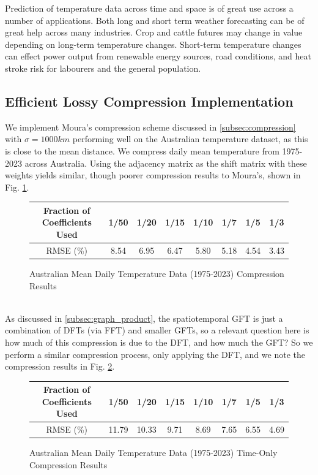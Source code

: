 \documentclass[12pt,a4paper]{article} %
\begin{document}
Prediction of temperature data across time and space is of great use across a number of applications. Both long and short term weather forecasting can be of great help across many industries. Crop and cattle futures may change in value depending on long-term temperature changes. Short-term temperature changes can effect power output from renewable energy sources, road conditions, and heat stroke risk for labourers and the general population.
\subsection{Efficient Lossy Compression Implementation}
\label{subsec:efficient_GFT}
 We implement Moura's compression scheme discussed in \ref{subsec:compression} with $\sigma=1000km$ performing well on the Australian temperature dataset, as this is close to the mean distance. We compress daily mean temperature from 1975-2023 across Australia. Using the adjacency matrix as the shift matrix with these weights yields similar, though poorer compression results to Moura's, shown in Fig. \ref{fig:aus_compression}.
\begin{figure}[!ht]
    \centering
        \begin{tabular}{|c|c|c|c|c|c|c|c|}
         \hline
         Fraction of Coefficients Used & 1/50 & 1/20 & 1/15 & 1/10 & 1/7 & 1/5 & 1/3 \\
         \hline
         RMSE (\%) & 8.54 & 6.95 & 6.47 & 5.80 & 5.18 & 4.54 & 3.43 \\
         \hline
    \end{tabular}
    \caption{Australian Mean Daily Temperature Data (1975-2023) Compression Results}
    \label{fig:aus_compression}
\end{figure}\\
As discussed in \ref{subsec:graph_product}, the spatiotemporal GFT is just a combination of DFTs (via FFT) and smaller GFTs, so a relevant question here is how much of this compression is due to the DFT, and how much the GFT? So we perform a similar compression process, only applying the DFT, and we note the compression results in Fig. \ref{fig:aus_compression2}.
\begin{figure}[!ht]
    \centering
        \begin{tabular}{|c|c|c|c|c|c|c|c|}
         \hline
         Fraction of Coefficients Used & 1/50 & 1/20 & 1/15 & 1/10 & 1/7 & 1/5 & 1/3 \\
         \hline
         RMSE (\%) & 11.79&	10.33&	9.71&	8.69&	7.65&	6.55&	4.69\\
         \hline
    \end{tabular}
    \caption{Australian Mean Daily Temperature Data (1975-2023) Time-Only Compression Results}
    \label{fig:aus_compression2}
\end{figure}\\
\end{document}
